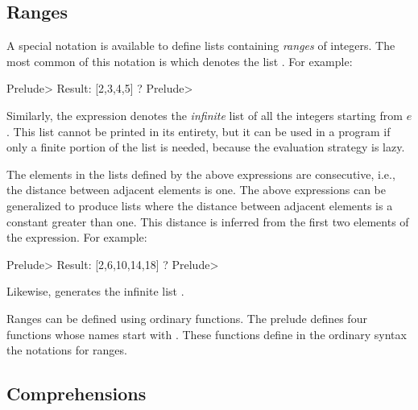 \subsection{Ranges}
\label{list-ranges}

A special notation is available to define lists containing
\emph{ranges} of integers.
The most common of this notation is \ccode{[$e_1$\,..\,$e_2$]}\pindex{[u..v]}
which denotes the list \ccode{[$e_1,e_1+1,e_1+2,\cdots,e_2$]}.
For example:
%
\begin{prog}
Prelude> \userinput{[2\,..\,5]}
Result: [2,3,4,5] ? 
Prelude> 
\end{prog}
%
Similarly, the expression \ccode{[$e$\,..]}\pindex{[u..]}
denotes the \emph{infinite}
list of all the integers starting from $e$.
This list cannot be printed in its entirety,
but it can be used in a program
if only a finite portion of the list is needed,
because the evaluation strategy is lazy.

The elements in the lists defined by the above expressions
are consecutive, i.e., the distance between adjacent elements is one.
The above expressions can be generalized to produce lists
where the distance between adjacent elements is a constant greater than one.
This distance is inferred from the first two elements of the expression.
For example:
%
\begin{prog}
Prelude> \userinput{[2,\,6\,..\,20]}\pindex{[u,v..w]}
Result: [2,6,10,14,18] ? 
Prelude> 
\end{prog}
%
Likewise, \ccode{[2,\,6\,..]}\pindex{[u,v..]}
generates the infinite list \ccode{[2,6,10,14,$\ldots$]}.

Ranges can be defined using ordinary functions.
The prelude defines four functions whose names start with
.  These functions define in the ordinary
syntax the notations for ranges.

\subsection{Comprehensions}
\label{list-comprehensions}

